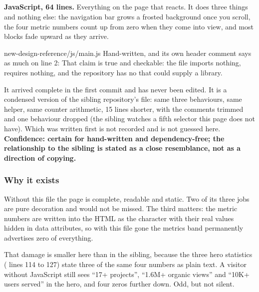 \subsection{}

\textbf{JavaScript, 64 lines.} Everything on the page that reacts. It does three
things and nothing else: the navigation bar grows a frosted background once you
scroll, the four metric numbers count up from zero when they come into view, and
most blocks fade upward as they arrive.

\begin{provenance}{new-design-reference/js/main.js}
Hand-written, and its own header comment says as much on line 2:  That claim is true and checkable: the file imports nothing,
requires nothing, and the repository has no  that could supply a
library.

It arrived complete in the first commit  and has never been edited.
It is a condensed version of the sibling repository's file: same three behaviours,
same helper, same counter arithmetic, 15 lines shorter, with the comments trimmed
and one behaviour dropped (the sibling watches a fifth selector this page does not
have). Which was written first is not recorded and is not guessed here.
\textbf{Confidence: certain for hand-written and dependency-free; the relationship
to the sibling is stated as a close resemblance, not as a direction of copying.}
\end{provenance}

\subsubsection*{Why it exists}

Without this file the page is complete, readable and static. Two of its three jobs
are pure decoration and would not be missed. The third matters: the metric numbers
are written into the HTML as the character  with their real values hidden
in data attributes, so with this file gone the metrics band permanently advertises
zero of everything.

That damage is smaller here than in the sibling, because the three hero statistics
( lines 114 to 127) state three of the same four numbers as plain
text. A visitor without JavaScript still sees ``17+ projects'', ``1.6M+ organic
views'' and ``10K+ users served'' in the hero, and four zeros further down. Odd,
but not silent.

